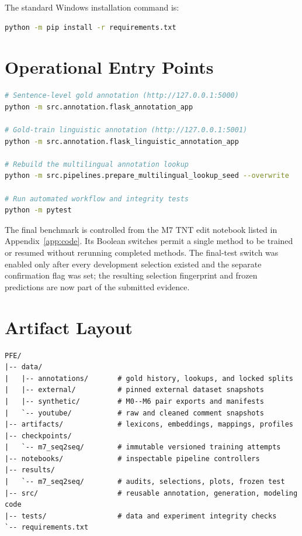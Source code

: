 \documentclass[12pt, a4paper, twoside, openany]{report}
\begin{document}


The standard Windows installation command is:

\begin{lstlisting}[language=bash, caption={Install the declared Python dependencies.}]
python -m pip install -r requirements.txt
\end{lstlisting}

\section{Operational Entry Points}

\begin{lstlisting}[language=bash, caption={Principal local application and audit entry points.}]
# Sentence-level gold annotation (http://127.0.0.1:5000)
python -m src.annotation.flask_annotation_app

# Gold-train linguistic annotation (http://127.0.0.1:5001)
python -m src.annotation.flask_linguistic_annotation_app

# Rebuild the multilingual annotation lookup
python -m src.pipelines.prepare_multilingual_lookup_seed --overwrite

# Run automated workflow and integrity tests
python -m pytest
\end{lstlisting}

The final benchmark is controlled from the M7 TNT edit notebook listed in Appendix~\ref{app:code}. Its Boolean switches permit a single method to be trained or resumed without rerunning completed methods. The final-test switch was enabled only after every development selection existed and the separate confirmation flag was set; the resulting selection fingerprint and frozen predictions are now part of the submitted evidence.

\section{Artifact Layout}

\begin{lstlisting}[caption={Logical project artifact layout.}]
PFE/
|-- data/
|   |-- annotations/       # gold history, lookups, and locked splits
|   |-- external/          # pinned external dataset snapshots
|   |-- synthetic/         # M0--M6 pair exports and manifests
|   `-- youtube/           # raw and cleaned comment snapshots
|-- artifacts/             # lexicons, embeddings, mappings, profiles
|-- checkpoints/
|   `-- m7_seq2seq/        # immutable versioned training attempts
|-- notebooks/             # inspectable pipeline controllers
|-- results/
|   `-- m7_seq2seq/        # audits, selections, plots, frozen test
|-- src/                   # reusable annotation, generation, modeling code
|-- tests/                 # data and experiment integrity checks
`-- requirements.txt
\end{lstlisting}
\end{document}

